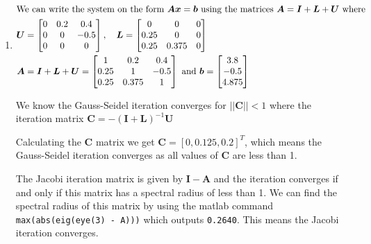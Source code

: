 \documentclass[a4paper]{article}
\begin{document}
\begin{enumerate}[label=\alph*)]
    \item 
        \begin{align}
            \intertext{We can write the system on the form \(\bm{A}\bm{x} =
                \bm{b}\) using the matrices \(\bm{A} = \bm{I} + \bm{L} +
                \bm{U}\) where}
            \bm{U} &=
            \begin{bmatrix}
                0 & 0.2 & 0.4 \\
                0 & 0 & -0.5 \\
                0 & 0 & 0 \\
            \end{bmatrix}, \quad
            \bm{L} =
            \begin{bmatrix}
                0 & 0 & 0 \\
                0.25 & 0 & 0 \\
                0.25 & 0.375 & 0 \\
            \end{bmatrix} \\
            \bm{A} &= \bm{I} + \bm{L} + \bm{U} =
            \begin{bmatrix}
                1 & 0.2 & 0.4 \\
                0.25 & 1 & -0.5 \\
                0.25 & 0.375 & 1 \\
            \end{bmatrix} 
            \text{ and }
            \bm{b} = 
                \begin{bmatrix}
                    3.8 \\
                    -0.5 \\
                    4.875 \\
                \end{bmatrix}
        \end{align}

        We know the Gauss-Seidel iteration converges for \(||\bm{C}|| < 1\)
            where the iteration matrix \(\bm{C} = -(\bm{I}+\bm{L})^{-1}\bm{U}\)

        Calculating the \(\bm{C}\) matrix we get \(\bm{C} = [0, 0.125,
            0.2]^T\), which means the Gauss-Seidel iteration converges as all values of \(\bm{C}\) are less than 1.

        The Jacobi iteration matrix is given by \(\bm{I} - \bm{A}\) and the
            iteration converges if and only if this matrix has a spectral
            radius of less than 1. We can find the spectral radius of this
            matrix by using the matlab command \texttt{max(abs(eig(eye(3) -
            A)))} which outputs \texttt{0.2640}. This means the Jacobi
            iteration converges.


\end{enumerate}
\end{document}
